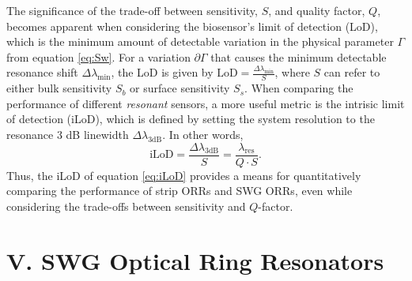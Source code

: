 \documentclass[aps,prl,twocolumn, superscriptaddress,nobalancelastpage]{revtex4}
\begin{document}
The significance of the trade-off between sensitivity, $S$, and quality factor, $Q$, becomes apparent when considering the biosensor's limit of detection (LoD), which is the minimum amount of detectable variation in the physical parameter $\Gamma$ from equation \eqref{eq:Sw}. For a variation $\partial \Gamma$ that causes the minimum detectable resonance shift $\Delta \lambda_\text{min}$, the LoD is given by $\text{LoD} = \frac{\Delta \lambda_\text{min}}{S}$, where $S$ can refer to either bulk sensitivity $S_b$ or surface sensitivity $S_s$. When comparing the performance of different \textit{resonant} sensors, a more useful metric is the intrisic limit of detection (iLoD), which is defined by setting the system resolution to the resonance 3 dB linewidth $\Delta \lambda_\text{3dB}$. In other words, \begin{equation}
\text{iLoD} = \frac{\Delta\lambda_\text{3dB}}{S} = \frac{\lambda_\text{res}}{Q\cdot S}.
\label{eq:iLoD}
\end{equation}
Thus, the iLoD of equation \eqref{eq:iLoD} provides a means for quantitatively comparing the performance of strip ORRs and SWG ORRs, even while considering the trade-offs between sensitivity and $Q$-factor. 

\section{V. SWG Optical Ring Resonators} %
\vspace{-1em}
\end{document}
